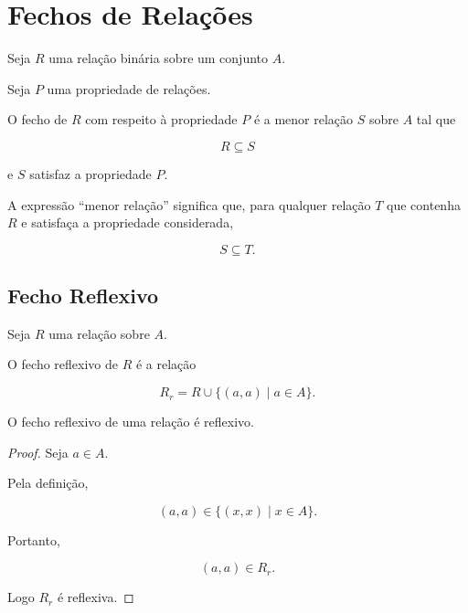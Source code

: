 \documentclass[../../main]{subfiles}
\begin{document}
\section{Fechos de Relações}
\label{sec:matematica:relacoes:fechos-de-relacoes}

\begin{defn}[Fecho]
	\label{def:matematica:relacoes:fechos:fecho}

	Seja \(R\) uma relação binária sobre um conjunto \(A\).

	Seja \(P\) uma propriedade de relações.

	O fecho de \(R\) com respeito à propriedade \(P\) é a menor relação
	\(S\) sobre \(A\) tal que

	\[
		R \subseteq S
	\]

	e \(S\) satisfaz a propriedade \(P\).

\end{defn}

\begin{obs}

	A expressão ``menor relação'' significa que, para qualquer relação
	\(T\) que contenha \(R\) e satisfaça a propriedade considerada,

	\[
		S \subseteq T.
	\]

\end{obs}

\subsection{Fecho Reflexivo}

\begin{defn}
	\label{def:matematica:relacoes:fechos:fecho-reflexivo}

	Seja \(R\) uma relação sobre \(A\).

	O fecho reflexivo de \(R\) é a relação

	\[
		R_r
		=
		R
		\cup
		\{
		(a,a)
		\mid
		a \in A
		\}.
	\]

\end{defn}

\begin{prop}
	\label{prop:matematica:relacoes:fechos:fecho-reflexivo-reflexivo}

	O fecho reflexivo de uma relação é reflexivo.

\end{prop}

\begin{proof}

	Seja \(a \in A\).

	Pela definição,

	\[
		(a,a)
		\in
		\{
		(x,x)
		\mid
		x \in A
		\}.
	\]

	Portanto,

	\[
		(a,a)\in R_r.
	\]

	Logo \(R_r\) é reflexiva.

\end{proof}
\end{document}
